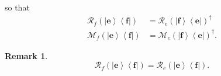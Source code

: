 \documentclass[aps,preprint]{revtex4}%
\newtheorem{remark}[theorem]{Remark}
\begin{document}
so that
\begin{align}
\mathcal{R}_{f}\left(  \left\vert \mathbf{e}\right\rangle \left\langle
\mathbf{f}\right\vert \right)   &  =\mathcal{R}_{e}\left(  \left\vert
\mathbf{f}\right\rangle \left\langle \mathbf{e}\right\vert \right)  ^{\dagger
}\\
\mathcal{M}_{f}\left(  \left\vert \mathbf{e}\right\rangle \left\langle
\mathbf{f}\right\vert \right)   &  =\mathcal{M}_{e}\left(  \left\vert
\mathbf{f}\right\rangle \left\langle \mathbf{e}\right\vert \right)  ^{\dagger
}.
\end{align}


\begin{remark}%
\begin{equation}
\mathcal{R}_{f}\left(  \left\vert \mathbf{e}\right\rangle \left\langle
\mathbf{f}\right\vert \right)  =\mathcal{R}_{e}\left(  \left\vert
\mathbf{e}\right\rangle \left\langle \mathbf{f}\right\vert \right)  .
\end{equation}

\end{remark}
\end{document}
